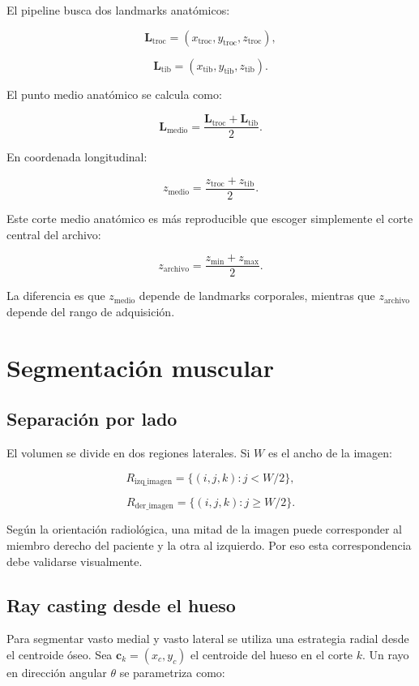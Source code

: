 \documentclass[12pt,a4paper]{article}
\begin{document}
El pipeline busca dos landmarks anatómicos:

\[
\mathbf{L}_{\text{troc}}=
(x_{\text{troc}},y_{\text{troc}},z_{\text{troc}}),
\]

\[
\mathbf{L}_{\text{tib}}=
(x_{\text{tib}},y_{\text{tib}},z_{\text{tib}}).
\]

El punto medio anatómico se calcula como:

\[
\mathbf{L}_{\text{medio}}
=
\frac{\mathbf{L}_{\text{troc}}+\mathbf{L}_{\text{tib}}}{2}.
\]

En coordenada longitudinal:

\[
z_{\text{medio}}
=
\frac{z_{\text{troc}}+z_{\text{tib}}}{2}.
\]

Este corte medio anatómico es más reproducible que escoger simplemente el corte central del archivo:

\[
z_{\text{archivo}} = \frac{z_{\min}+z_{\max}}{2}.
\]

La diferencia es que \(z_{\text{medio}}\) depende de landmarks corporales, mientras que \(z_{\text{archivo}}\) depende del rango de adquisición.

\section{Segmentación muscular}

\subsection{Separación por lado}

El volumen se divide en dos regiones laterales. Si \(W\) es el ancho de la imagen:

\[
R_{\text{izq\_imagen}} = \{(i,j,k): j < W/2\},
\]

\[
R_{\text{der\_imagen}} = \{(i,j,k): j \geq W/2\}.
\]

Según la orientación radiológica, una mitad de la imagen puede corresponder al miembro derecho del paciente y la otra al izquierdo. Por eso esta correspondencia debe validarse visualmente.

\subsection{Ray casting desde el hueso}

Para segmentar vasto medial y vasto lateral se utiliza una estrategia radial desde el centroide óseo. Sea \(\mathbf{c}_k=(x_c,y_c)\) el centroide del hueso en el corte \(k\). Un rayo en dirección angular \(\theta\) se parametriza como:
\end{document}
